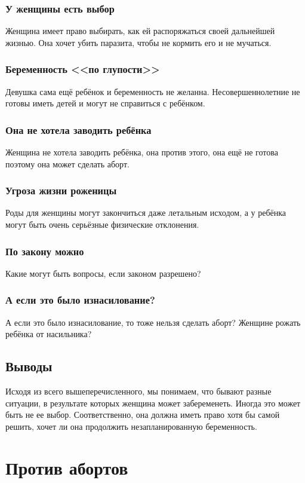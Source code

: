 \documentclass[a4paper,12pt]{report}
\begin{document}
    \section{У женщины есть выбор}
        Женщина имеет право выбирать, как ей распоряжаться своей дальнейшей жизнью. 
        Она хочет убить паразита, чтобы не кормить его и не мучаться.
    \section{Беременность <<по глупости>>}
        Девушка сама ещё ребёнок и беременность не желанна.
        Несовершеннолетние не готовы иметь детей и могут не справиться с ребёнком.
    \section{Она не хотела заводить ребёнка}
        Женщина не хотела заводить ребёнка, она против этого, она ещё не 
        готова поэтому она может сделать аборт.
    \section{Угроза жизни роженицы}
        Роды для женщины могут закончиться даже летальным исходом, 
        а у ребёнка могут быть очень серьёзные физические отклонения.
    \section{По закону можно}
        Какие могут быть вопросы, если законом разрешено?
    \section{А если это было изнасилование?}
        А если это было изнасилование, то тоже нельзя сделать аборт? Женщине рожать ребёнка от насильника?


\chapter{Выводы}
Исходя из всего вышеперечисленного, мы понимаем, что бывают разные ситуации, 
в результате которых женщина может забеременеть. Иногда это может быть не ее 
выбор. Соответственно, она должна иметь право хотя бы самой решить, хочет ли она 
продолжить незапланированную беременность.


\part{Против абортов}
\end{document}
